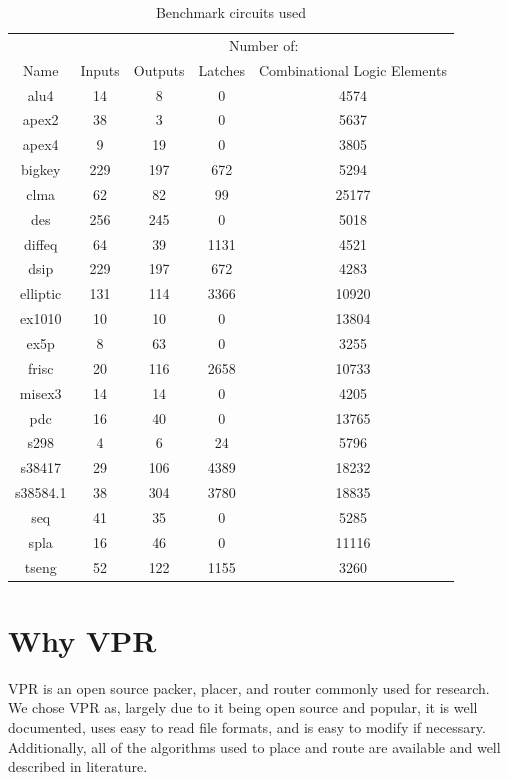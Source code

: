\documentclass[12pt,drafta4paper,oneside]{memoir} %
\begin{document}
\begin{table}
    \begin{tabular}{c|cccc}
     & \multicolumn{4}{c}{Number of:}\\
     Name & Inputs & Outputs & Latches & Combinational Logic Elements\\
        alu4 & 14 & 8 & 0 & 4574\\
        apex2 & 38 & 3 & 0 & 5637\\
        apex4 & 9 & 19 & 0 & 3805\\     
        bigkey & 229 & 197 & 672 & 5294\\
        clma & 62 & 82 & 99 & 25177\\
        des & 256 & 245 & 0 & 5018\\
        diffeq & 64 & 39 & 1131 & 4521\\
        dsip & 229 & 197 & 672 & 4283\\
        elliptic & 131 & 114 & 3366 & 10920\\
        ex1010 & 10 & 10 & 0 & 13804\\
        ex5p & 8 & 63 & 0 & 3255\\
        frisc & 20 & 116 & 2658 & 10733\\
        misex3 & 14 & 14 & 0 & 4205\\
        pdc & 16 & 40 & 0 & 13765\\
        s298     & 4 & 6 & 24 & 5796\\
        s38417   & 29 & 106 & 4389 & 18232\\
        s38584.1 & 38 & 304 & 3780 & 18835\\
        seq      & 41 & 35 & 0 & 5285\\
        spla     & 16 & 46 & 0 & 11116\\
        tseng    & 52 & 122 & 1155 & 3260
    \end{tabular}
    \caption{Benchmark circuits used}
    \label{benchmarkList}
\end{table}


\section{Why VPR}
\ac{VPR} is an open source packer, placer, and router commonly used for research. We chose \ac{VPR} as, largely due to it being open source and popular, it is well documented, uses easy to read file formats, and is easy to modify if necessary. Additionally, all of the algorithms used to place and route are available and well described in literature.
\end{document}
